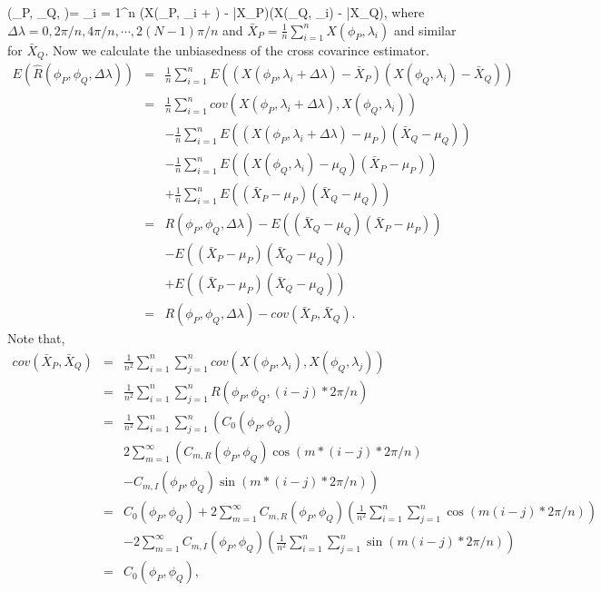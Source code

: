 \beq \label{cross_covariance}
(\phi_P, \phi_Q, \Delta \lambda)= \sum_{i = 1}^n (X(\phi_P, \lambda_i + \Delta \lambda) - \bar{X}_P)(X(\phi_Q, \lambda_i) - \bar{X}_Q),
\eeq
where $\Delta \lambda = 0, 2\pi/n, 4\pi/n, \cdots, 2(N-1)\pi/n$ and $\bar{X}_P = \frac{1}{n}\sum_{i=1}^n X(\phi_P, \lambda_i)$ and similar for $\bar{X}_Q$. Now we calculate the unbiasedness of the cross covarince estimator.	
\begin{eqnarray*}
				E(\hat{R}(\phi_P, \phi_Q, \Delta \lambda)) &=& \frac{1}{n}\sum_{i = 1}^n E((X(\phi_P, \lambda_i + \Delta \lambda) - \bar{X}_P)(X(\phi_Q, \lambda_i) - \bar{X}_Q)) \\
				&=& \frac{1}{n}\sum_{i=1}^n cov(X(\phi_P, \lambda_i+\Delta \lambda), X(\phi_Q, \lambda_i)) \\
				& & - \frac{1}{n}\sum_{i = 1}^n E((X(\phi_P, \lambda_i + \Delta \lambda) - \mu_P)(\bar{X}_Q - \mu_Q)) \\
				& & -\frac{1}{n}\sum_{i = 1}^n E((X(\phi_Q, \lambda_i) - \mu_Q)(\bar{X}_P - \mu_P)) \\
				& & + \frac{1}{n}\sum_{i = 1}^n E((\bar{X}_P - \mu_P)(\bar{X}_Q - \mu_Q)) \\
				&=& R(\phi_P, \phi_Q, \Delta \lambda) -E((\bar{X}_Q - \mu_Q)(\bar{X}_P - \mu_P)) \\
				& & - E((\bar{X}_P - \mu_P)(\bar{X}_Q - \mu_Q)) \\
				& & + E((\bar{X}_P - \mu_P)(\bar{X}_Q - \mu_Q)) \\
				&=& R(\phi_P, \phi_Q, \Delta \lambda) - cov(\bar{X}_P, \bar{X}_Q).
\end{eqnarray*}
Note that,
\begin{eqnarray*}
				cov(\bar{X}_P, \bar{X}_Q) &=&  \frac{1}{n^2}\sum_{i = 1}^n \sum_{j=1}^n cov(X(\phi_P, \lambda_i), X(\phi_Q, \lambda_j)) \\
				&=& \frac{1}{n^2}\sum_{i = 1}^n \sum_{j=1}^n R(\phi_P, \phi_Q, (i-j)*2\pi/n) \\
				&=& \frac{1}{n^2}\sum_{i = 1}^n \sum_{j=1}^n \left( C_0(\phi_P, \phi_Q) \right.\\
				& &  2\sum_{m=1}^\infty \left( C_{m, R}(\phi_P, \phi_Q) \cos(m*(i-j)*2\pi/n) \right. \\
				& & \left.- C_{m, I}(\phi_P, \phi_Q) \sin(m*(i-j)*2\pi/n) \right) \\
				&=& C_0(\phi_P, \phi_Q) + 2\sum_{m=1}^\infty C_{m, R}(\phi_P, \phi_Q) \left(\frac{1}{n^2}\sum_{i = 1}^n \sum_{j=1}^n \cos(m(i-j)*2\pi/n)\right) \\
				& & - 2\sum_{m=1}^\infty C_{m, I}(\phi_P, \phi_Q) \left(\frac{1}{n^2}\sum_{i = 1}^n \sum_{j=1}^n \sin(m(i-j)*2\pi/n)\right) \\
				&=& C_0(\phi_P, \phi_Q),
			\end{eqnarray*}			
